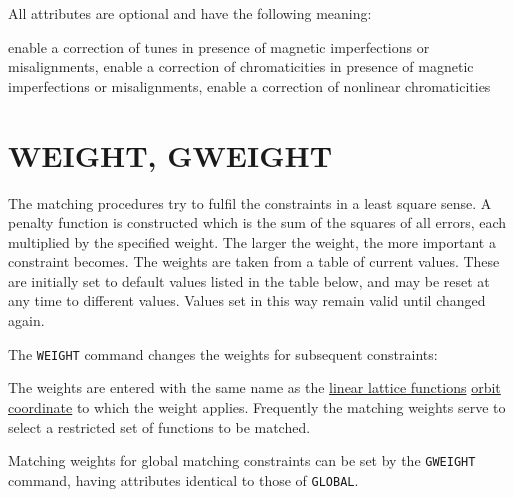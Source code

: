 

All attributes are optional and have the following meaning:
\begin{madlist}
   enable a correction of tunes in presence of
  magnetic imperfections or misalignments, 
  enable a correction of chromaticities in presence of
  magnetic imperfections or misalignments, 
   enable a correction of nonlinear chromaticities
\end{madlist}


\section{WEIGHT, GWEIGHT}
\label{sec:weight}\label{sec:gweight}

The matching procedures try to fulfil the constraints
in a least square sense.
A penalty function is constructed which is the sum of the
squares of all errors,
each multiplied by the specified weight.
The larger the weight, the more important a constraint becomes.
The weights are taken from a table of current values.
These are initially set to default values listed in the table below,
and may be reset at any time to different values.
Values set in this way remain valid until changed again.

The \texttt{WEIGHT} command changes the weights for subsequent
constraints: 

The weights are entered with the same name as the
\href{../Introduction/tables.html#linear}{linear lattice functions}
\href{../Introduction/closed_orbit.html}{orbit coordinate} 
to which the weight applies.
Frequently the matching weights serve to select a restricted
set of functions to be matched.


Matching weights for global matching constraints can be set by the 
\texttt{GWEIGHT} command, having attributes identical to those of
\texttt{GLOBAL}.



